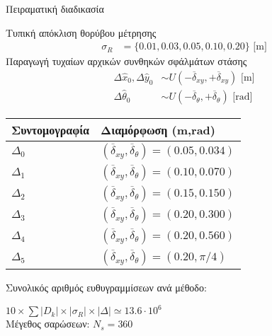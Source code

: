 \begin{frame}{Πειραματική διαδικασία}
{\begin{minipage}{\linewidth}
\begin{minipage}{0.56\linewidth}
\begin{bw_box}
        Τυπική απόκλιση θορύβου μέτρησης\vspace{-0.25cm}
      \begin{align}
        \sigma_R &= \{0.01, 0.03, 0.05, 0.10, 0.20\} \text{ [m]} \nonumber
      \end{align}
        Παραγωγή τυχαίων αρχικών συνθηκών σφάλμάτων στάσης\vspace{-0.25cm}
      \begin{align}
        \Delta \hat{x}_0,\Delta \hat{y}_0     &\sim U(-\overline{\delta}_{xy},+\overline{\delta}_{xy}) \text{ [m]} \nonumber \\
        \Delta\hat{\theta}_0 &\sim U(-\overline{\delta}_{\theta},+\overline{\delta}_{\theta} )  \text{ [rad]}\nonumber
      \end{align}
        \vspace{-0.8cm}
      \begin{table}\centering
        \begin{tabular}{ll}
        Συντομογραφία         & Διαμόρφωση (m,rad)                                                      \\  \toprule
        $\Delta_0$            & $(\overline{\delta}_{xy}, \overline{\delta}_{\theta}) = (0.05, 0.034)$  \\
        $\Delta_1$            & $(\overline{\delta}_{xy}, \overline{\delta}_{\theta}) = (0.10, 0.070)$  \\
        $\Delta_2$            & $(\overline{\delta}_{xy}, \overline{\delta}_{\theta}) = (0.15, 0.150)$  \\
        $\Delta_3$            & $(\overline{\delta}_{xy}, \overline{\delta}_{\theta}) = (0.20, 0.300)$  \\
        $\Delta_4$            & $(\overline{\delta}_{xy}, \overline{\delta}_{\theta}) = (0.20, 0.560)$  \\
        $\Delta_5$            & $(\overline{\delta}_{xy}, \overline{\delta}_{\theta}) = (0.20, \pi/4)$  \\  \bottomrule
        \end{tabular}
      \end{table}

      Συνολικός αριθμός ευθυγραμμίσεων ανά μέθοδο:

      $10 \times \sum |D_k| \times |\sigma_R| \times |\Delta| \simeq 13.6 \cdot 10^6$\\

      Μέγεθος σαρώσεων: $N_s = 360$\\


\end{bw_box}
\end{minipage}
\end{minipage}}
\end{frame}
